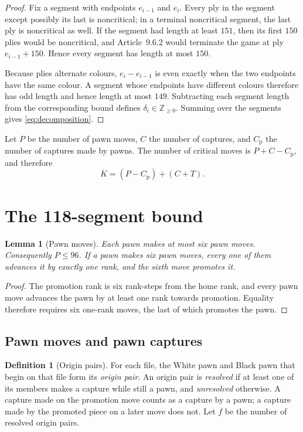 \documentclass[11pt]{article}
\newtheorem{lemma}[theorem]{Lemma}
\theoremstyle{definition}
\newtheorem{definition}[theorem]{Definition}
\begin{document}
\begin{proof}
Fix a segment with endpoints $e_{i-1}$ and $e_i$. Every ply in the segment
except possibly its last is noncritical; in a terminal noncritical segment, the
last ply is noncritical as well. If the segment had length at least $151$,
then its first $150$ plies would be noncritical, and Article~9.6.2 would terminate the game at ply
$e_{i-1}+150$. Hence every segment has length at most $150$.

Because plies alternate colours, $e_i-e_{i-1}$ is even exactly when the two
endpoints have the same colour. A segment whose endpoints have different
colours therefore has odd length and hence length at most $149$. Subtracting
each segment length from the corresponding bound defines
$\delta_i\in\mathbb Z_{\ge0}$. Summing over the segments gives
\eqref{eq:decomposition}.
\end{proof}

Let $P$ be the number of pawn moves, $C$ the number of captures, and
$C_{\mathrm p}$ the number of captures made by pawns. The number of critical
moves is $P+C-C_{\mathrm p}$, and therefore
\begin{equation}\label{eq:K}
  K=(P-C_{\mathrm p})+(C+T).
\end{equation}

\section{The 118-segment bound}\label{sec:k118}

\begin{lemma}[Pawn moves]\label{lem:pawnbasics}
Each pawn makes at most six pawn moves. Consequently $P\le96$. If a pawn
makes six pawn moves, every one of them advances it by exactly one rank, and
the sixth move promotes it.
\end{lemma}

\begin{proof}
The promotion rank is six rank-steps from the home rank, and every pawn move
advances the pawn by at least one rank towards promotion. Equality therefore
requires six one-rank moves, the last of which promotes the pawn.
\end{proof}

\subsection{Pawn moves and pawn captures}

\begin{definition}[Origin pairs]\label{def:originpair}
For each file, the White pawn and Black pawn that begin on that file form its
\emph{origin pair}. An origin pair is \emph{resolved} if at least one of its
members makes a capture while still a pawn, and \emph{unresolved} otherwise.
A capture made on the promotion move counts as a capture by a pawn; a
capture made by the promoted piece on a later move does not. Let $f$ be
the number of resolved origin pairs.
\end{definition}
\end{document}

